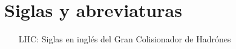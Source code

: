 \section{Siglas y abreviaturas }
\begin{itemize}
\item[LHC:] Siglas en inglés del Gran Colisionador de Hadrónes
\end{itemize}






